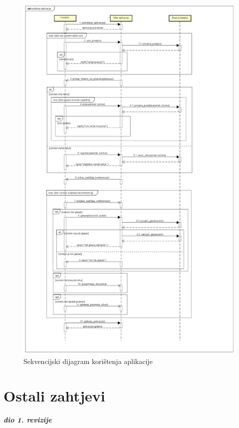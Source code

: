 				\begin{figure}[H]
					\includegraphics[scale=0.3]{slike/koristenje_aplikacije.JPG} %
					\centering
					\caption{Sekvencijski dijagram korištenja aplikacije}
					\label{fig:promjene}
				\end{figure}
	
		\section{Ostali zahtjevi}
		
			\textbf{\textit{dio 1. revizije}}\\
		 
